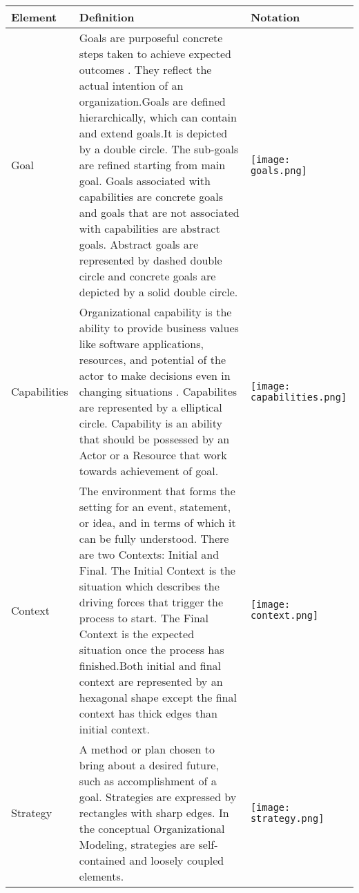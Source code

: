 \begin{center}
	\begin{longtable}{p{3cm}p{10cm}p{3cm}}
		\toprule 
		\textbf{Element} & \textbf{Definition} & \textbf{Notation} \\
		\midrule
		\endfirsthead
		Goal 			& Goals are purposeful concrete steps taken to achieve expected outcomes . They reflect the actual intention of an organization.Goals are defined hierarchically, which can contain and extend goals.It is depicted by a double circle. The sub-goals are refined starting from main goal. Goals associated with capabilities are concrete goals and goals that are not associated with capabilities are abstract goals. Abstract goals are represented by dashed double circle and concrete goals are depicted by a solid double circle. & \begin{center} \texttt{[image: goals.png]}  \end{center}  \\  
		
		Capabilities	& Organizational capability is the ability to provide business values like software applications, resources, and potential of the actor to make decisions even in changing situations \cite{Stirna2012}. Capabilites are represented by a elliptical circle. Capability is an ability that should be possessed by an Actor or a Resource that work towards achievement of goal.   & \begin{center} \texttt{[image: capabilities.png]} \end{center}   \\
		
		Context				& The environment that forms the setting for an event, statement, or idea, and in terms of which it can be fully understood. There are two Contexts: Initial and Final. The Initial Context is the situation which describes the driving forces that trigger the process to start. The Final Context is the expected situation once the process has finished.Both initial and final context are represented by an hexagonal shape except the final context has thick edges than initial context.  & \begin{center} \texttt{[image: context.png]} \end{center}  \\
		
		
		Strategy		&  A method or plan chosen to bring about a desired future, such as accomplishment of a goal. Strategies are expressed by rectangles with sharp edges. In the conceptual Organizational Modeling, strategies are self-contained and loosely coupled elements.   & \begin{center} \texttt{[image: strategy.png]} \end{center}   \\
		

\end{longtable}
\end{center}
